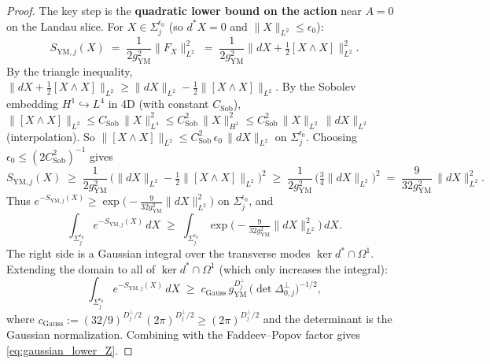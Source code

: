 \begin{proof}
The key step is the \textbf{quadratic lower bound on the action} near
$A=0$ on the Landau slice. For $X\in\Sigma_{j}^{\epsilon_{0}}$ (so
$d^{*}X=0$ and $\|X\|_{L^{2}}\le\epsilon_{0}$):
\begin{equation}
\label{eq:action_quadratic}
  S_{\mathrm{YM},j}(X)
  \;=\;\frac{1}{2g_{\mathrm{YM}}^{2}}\|F_{X}\|_{L^{2}}^{2}
  \;=\;\frac{1}{2g_{\mathrm{YM}}^{2}}\|dX+\tfrac{1}{2}[X\wedge X]\|
  _{L^{2}}^{2}.
\end{equation}
By the triangle inequality,
$\|dX+\tfrac{1}{2}[X\wedge X]\|_{L^{2}}\ge\|dX\|_{L^{2}}-\tfrac{1}{2}
\|[X\wedge X]\|_{L^{2}}$. By the Sobolev embedding
$H^{1}\hookrightarrow L^{4}$ in 4D (with constant $C_{\mathrm{Sob}}$),
$\|[X\wedge X]\|_{L^{2}}\le C_{\mathrm{Sob}}\,\|X\|_{L^{4}}^{2}\le
C_{\mathrm{Sob}}^{2}\,\|X\|_{H^{1}}^{2}\le
C_{\mathrm{Sob}}^{2}\,\|X\|_{L^{2}}\,\|dX\|_{L^{2}}$ (interpolation).
So $\|[X\wedge X]\|_{L^{2}}\le C_{\mathrm{Sob}}^{2}\,\epsilon_{0}\,
\|dX\|_{L^{2}}$ on $\Sigma_{j}^{\epsilon_{0}}$. Choosing
$\epsilon_{0}\le(2C_{\mathrm{Sob}}^{2})^{-1}$ gives
\begin{equation}
\label{eq:action_lower}
  S_{\mathrm{YM},j}(X)\;\ge\;\frac{1}{2g_{\mathrm{YM}}^{2}}\,
  \bigl(\|dX\|_{L^{2}}-\tfrac{1}{2}\|[X\wedge X]\|_{L^{2}}\bigr)^{2}
  \;\ge\;\frac{1}{2g_{\mathrm{YM}}^{2}}\,
  \bigl(\tfrac{3}{4}\|dX\|_{L^{2}}\bigr)^{2}
  \;=\;\frac{9}{32g_{\mathrm{YM}}^{2}}\,\|dX\|_{L^{2}}^{2}.
\end{equation}
Thus $e^{-S_{\mathrm{YM},j}(X)}\ge\exp\!\bigl(-\tfrac{9}{32g_{
\mathrm{YM}}^{2}}\|dX\|_{L^{2}}^{2}\bigr)$ on $\Sigma_{j}^{
\epsilon_{0}}$, and
\begin{equation}
\label{eq:Z_gaussian}
  \int_{\Sigma_{j}^{\epsilon_{0}}}e^{-S_{\mathrm{YM},j}(X)}\,dX
  \;\ge\;\int_{\Sigma_{j}^{\epsilon_{0}}}
  \exp\!\bigl(-\tfrac{9}{32g_{\mathrm{YM}}^{2}}\|dX\|_{L^{2}}^{2}
  \bigr)\,dX.
\end{equation}
The right side is a Gaussian integral over the transverse modes
$\ker d^{*}\cap\Omega^{1}$. Extending the domain to all of
$\ker d^{*}\cap\Omega^{1}$ (which only increases the integral):
\begin{equation}
\label{eq:Z_gaussian_full}
  \int_{\Sigma_{j}^{\epsilon_{0}}}e^{-S_{\mathrm{YM},j}(X)}\,dX
  \;\ge\;c_{\mathrm{Gauss}}\,g_{\mathrm{YM}}^{D_{j}^{\perp}}\,
  \bigl(\det\Delta_{0,j}^{\perp}\bigr)^{-1/2},
\end{equation}
where $c_{\mathrm{Gauss}}:=(32/9)^{D_{j}^{\perp}/2}\,(2\pi)^{D_{
j}^{\perp}/2}\ge(2\pi)^{D_{j}^{\perp}/2}$ and the determinant is
the Gaussian normalization. Combining with the Faddeev--Popov factor
gives \eqref{eq:gaussian_lower_Z}.
\end{proof}

